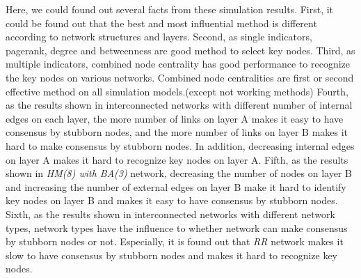Here, we could found out several facts from these simulation results. First, it could be found out that the best and most influential method is different according to network structures and layers. Second, as single indicators, pagerank, degree and betweenness are good method to select key nodes. Third, as multiple indicators, combined node centrality has good performance to recognize the key nodes on various networks. Combined node centralities are first or second effective method on all simulation models.(except not working methods)  Fourth, as the results shown in interconnected networks with different number of internal edges on each layer, the more number of links on layer A makes it easy to have consensus by stubborn nodes, and the more number of links on layer B makes it hard to make consensus by stubborn nodes. In addition, decreasing internal edges on layer A makes it hard to recognize key nodes on layer A.  Fifth, as the results shown in \textit{HM(8) with BA(3)} network, decreasing the number of nodes on layer B and increasing the number of external edges on layer B make it hard to identify key nodes on layer B and makes it easy to have consensus by stubborn nodes. Sixth, as the results shown in interconnected networks with different network types, network types have the influence to whether network can make consensus by stubborn nodes or not. Especially, it is found out that \textit{RR} network makes it slow to have consensus by stubborn nodes and makes it hard to recognize key nodes. 



